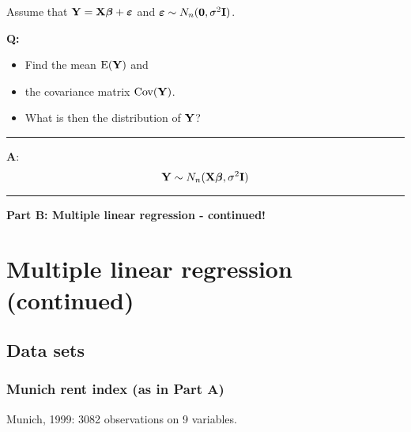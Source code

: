 \documentclass[]{article}
\providecommand{\tightlist}{%
  \setlength{\itemsep}{0pt}\setlength{\parskip}{0pt}}
\begin{document}
Assume that \({\bf Y=X \boldsymbol\beta}+{\boldsymbol \varepsilon}\) and
\(\boldsymbol\varepsilon\sim N_n({\bf 0},\sigma^2 {\bf I})\).

\textbf{Q:}

\begin{itemize}
\tightlist
\item
  Find the mean \(\text{E}(\bf Y)\) and
\item
  the covariance matrix \(\text{Cov}(\bf Y)\).
\item
  What is then the distribution of \(\bf Y\)?
\end{itemize}

\begin{center}\rule{0.5\linewidth}{\linethickness}\end{center}

\textbf{A}:
\[ {\bf Y} \sim N_{n}({\bf X} {\boldsymbol\beta},\sigma^2 {\bf I})\]

\begin{center}\rule{0.5\linewidth}{\linethickness}\end{center}

\large

\textbf{Part B: Multiple linear regression - continued!}

\normalsize

\hypertarget{multiple-linear-regression-continued}{%
\section{Multiple linear regression
(continued)}\label{multiple-linear-regression-continued}}

\hypertarget{data-sets}{%
\subsection{Data sets}\label{data-sets}}

\hypertarget{munich-rent-index-as-in-part-a}{%
\subsubsection{Munich rent index (as in Part
A)}\label{munich-rent-index-as-in-part-a}}

Munich, 1999: 3082 observations on 9 variables.
\end{document}
